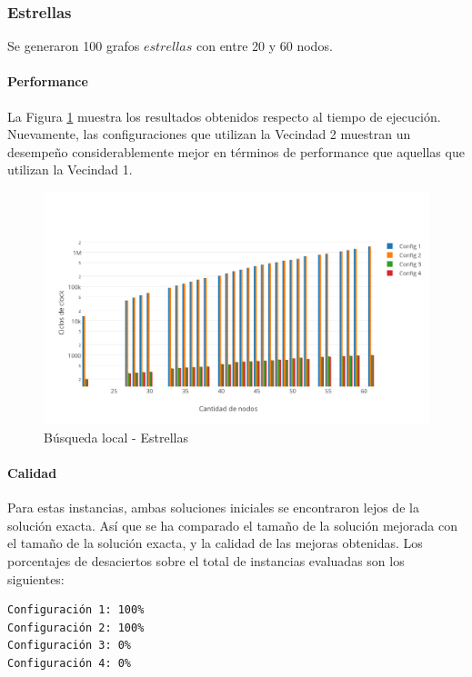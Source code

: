 \subsubsection{Estrellas}

Se generaron 100 grafos $estrellas$ con entre 20 y 60 nodos.

\paragraph{Performance}

La Figura \ref{fig:3B} muestra los resultados obtenidos respecto al tiempo de ejecución. Nuevamente, las configuraciones que utilizan la Vecindad 2 muestran un desempeño considerablemente mejor en términos de performance que aquellas que utilizan la Vecindad 1.

\begin{figure}[htb]
	\begin{center}
    		\includegraphics[scale=0.8]{imagenes/busqlocal-estrellas-tiempo.png}
	\end{center}
	\caption{Búsqueda local - Estrellas}\label{fig:3B}
\end{figure}

\paragraph{Calidad} Para estas instancias, ambas soluciones iniciales se encontraron lejos de la solución exacta. Así que se ha comparado el tamaño de la solución mejorada con el tamaño de la solución exacta, y la calidad de las mejoras obtenidas.  Los porcentajes de desaciertos sobre el total de instancias evaluadas son los siguientes:

\begin{verbatim}
Configuración 1: 100%
Configuración 2: 100%
Configuración 3: 0%
Configuración 4: 0%
\end{verbatim}

